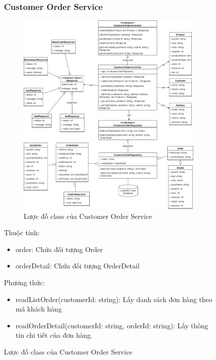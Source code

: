 \begin{figure}[!htp]
\subsubsection{Customer Order Service}
\begin{figure}[!htp]
	\centering
	\includegraphics[width=13cm]{img/Architecture/service/CustomerOrderService.png}
	\newline
	\caption{Lược đồ class của Customer Order Service}
\end{figure}

	Thuộc tính:
	\begin{itemize}
		\item order: Chứa đối tượng Order
		\item orderDetail: Chứa đối tượng OrderDetail
	\end{itemize}
	Phương thức:
	\begin{itemize}
		\item readListOrder(customerId: string): Lấy danh sách đơn hàng theo mã khách hàng
		\item readOrderDetail(customerId: string, orderId: string): Lấy thông tin chi tiết của đơn hàng.
	\end{itemize}


\end{figure}
